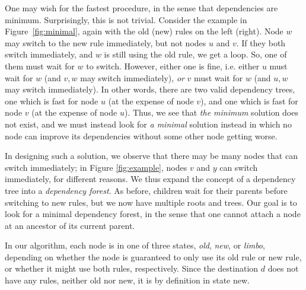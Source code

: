 One may wish for the fastest procedure, in the sense that dependencies are minimum. Surprisingly, this is not trivial. Consider the example in Figure~\ref{fig:minimal}, again with the old (new) rules on the left (right). Node $w$ may switch to the new rule immediately, but not nodes $u$ and $v$. If they both switch immediately, and $w$ is still using the old rule, we get a loop. So, one of them must wait for $w$ to switch. However, either one is fine, i.e. either $u$ must wait for $w$ (and $v,w$ may switch immediately), \emph{or} $v$ must wait for $w$ (and $u,w$ may switch immediately). In other words, there are two valid dependency trees, one which is fast for node $u$ (at the expense of node $v$), and one which is fast for node $v$ (at the expense of node $u$).
Thus, we see that \emph{the minimum} solution does not exist, and we must instead look for \emph{a minimal} solution instead in which no node can improve its dependencies without some other node getting worse.

In designing such a solution, we observe that there may be many nodes that can switch immediately; in Figure \ref{fig:example}, nodes $v$ and $y$ can switch immediately, for different reasons. We thus expand the concept of a dependency tree into a \emph{dependency forest}. As before, children wait for their parents before switching to new rules, but we now have multiple roots and trees. Our goal is to look for a minimal dependency forest, in the sense that one cannot attach a node at an ancestor of its current parent.

In our algorithm, each node is in one of three states, \emph{old}, \emph{new}, or \emph{limbo}, depending on whether the node is guaranteed to only use its old rule or new rule, or whether it might use both rules, respectively. Since the destination $d$ does not have any rules, neither old nor new, it is by definition in state new.

